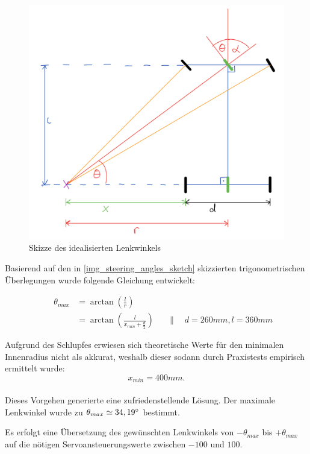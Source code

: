 \documentclass[a4paper,12pt]{report}
\begin{document}
	\begin{figure}[ht]
		\centering
		\includegraphics[width=\textwidth,height=\textheight,keepaspectratio]{assets/Lenkwinkel_Skizze}
		\caption{Skizze des idealisierten Lenkwinkels}
		\label{img_steering_angles_sketch}
	\end{figure}
	\pagebreak

	Basierend auf den in \autoref{img_steering_angles_sketch} skizzierten trigonometrischen Überlegungen wurde folgende Gleichung entwickelt:
	
	\begin{align*}
		&&\theta_{max} &= \arctan\left( \frac{l}{r} \right)\\
		&&&= \arctan\left( \frac{l}{x_{min} + \frac{d}{2}} \right) &&\|\quad d = 260mm, l = 360mm
	\end{align*}

	Aufgrund des Schlupfes erwiesen sich theoretische Werte für den minimalen Innenradius nicht als akkurat, weshalb dieser sodann durch  Praxistests empirisch ermittelt wurde:
		\[x_{min} = 400mm.\] 
	\\
	Dieses Vorgehen generierte eine zufriedenstellende Lösung.
	Der maximale Lenkwinkel wurde zu $\theta_{max} \simeq 34,19\degree$ bestimmt.
	
	Es erfolgt eine Übersetzung des gewünschten Lenkwinkels von $-\theta_{max}$ bis $+\theta_{max}$ auf die nötigen Servoansteuerungswerte zwischen $-100$ und $100$.
\end{document}
